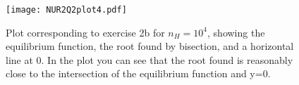 \begin{figure}[h!]
  \centering
  \texttt{[image: NUR2Q2plot4.pdf]}
  \caption{Plot corresponding to exercise 2b for $n_H = 10^4$, showing the equilibrium function, the root found by bisection, and a horizontal line at 0. In the plot you can see that the root found is reasonably close to the intersection of the equilibrium function and y=0.}
  \label{fig:fig4}
\end{figure} 
